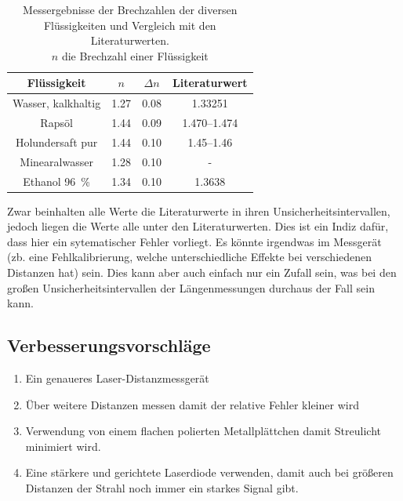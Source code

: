\documentclass[11pt,ngerman]{scrartcl}
\begin{document}
\begin{table}[H]
    \centering
    \caption{Messergebnisse der Brechzahlen der diversen Flüssigkeiten und Vergleich mit den Literaturwerten.\\
    $n$ die Brechzahl einer Flüssigkeit}
    \label{tab:ergebnisse}
    \begin{tabular}{c|S|S|S}
        Flüssigkeit          & {$n$} & {$\Delta n$} & {Literaturwert}                         \\ \hline
        Wasser, kalkhaltig   & 1.27  & 0.08         & 1.33251 \cite{brechzahlwasser} \\
        Rapsöl               & 1.44  & 0.09         & \numrange{1.470}{1.474} \cite{brechzahloele}  \\
        Holundersaft pur     & 1.44  & 0.10         & \numrange{1.45}{1.46} \cite{brechzahlsirup} \\
        Minearalwasser      & 1.28  & 0.10         & { - } \\
        Ethanol \SI{96}{\percent}      & 1.34  & 0.10         & 1.3638 \cite{brechzahlethanol} \\
    \end{tabular}
\end{table}

Zwar beinhalten alle Werte die Literaturwerte in ihren Unsicherheitsintervallen,
jedoch liegen die Werte alle unter den Literaturwerten. Dies ist ein Indiz dafür, dass 
hier ein sytematischer Fehler vorliegt. Es könnte irgendwas im Messgerät (zb. eine Fehlkalibrierung, welche unterschiedliche Effekte bei
verschiedenen Distanzen hat) sein. Dies kann aber auch einfach nur ein Zufall
sein, was bei den großen Unsicherheitsintervallen der Längenmessungen 
durchaus der Fall sein kann. 

\subsection{Verbesserungsvorschläge}
\begin{enumerate}
    \item Ein genaueres Laser-Distanzmessgerät
    \item Über weitere Distanzen messen damit der relative Fehler kleiner wird
    \item Verwendung von einem flachen polierten Metallplättchen damit Streulicht minimiert wird.
    \item Eine stärkere und gerichtete Laserdiode verwenden, damit auch bei größeren Distanzen der
        Strahl noch immer ein starkes Signal gibt.
\end{enumerate}
\end{document}
